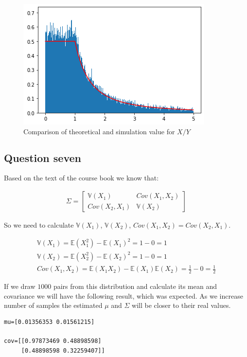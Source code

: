 \documentclass[12pt, a4paper]{book}
\begin{document}
\begin{figure}[h]
    \centering
    \includegraphics[width=0.5\linewidth]{images/question6/xy.png}
    \caption{Comparison of theoretical and simulation value for $X/Y$}
    \label{xy}
\end{figure}

\clearpage

\subsection*{Question seven}

Based on the text of the course book we know that:

\begin{eqnarray*}
    \Sigma = \begin{bmatrix}
        \mathbb{V}(X_1) & Cov(X_1, X_2) \\
        Cov(X_2, X_1) & \mathbb{V}(X_2)
    \end{bmatrix}
\end{eqnarray*}

So we need to calculate $\mathbb{V}(X_1)$, $\mathbb{V}(X_2)$, $Cov(X_1, X_2)=Cov(X_2, X_1)$.

\begin{eqnarray*}
    \mathbb{V}(X_1) = \mathbb{E}(X_1^2) - \mathbb{E}(X_1)^2 = 1 - 0 = 1 \\
    \mathbb{V}(X_2) = \mathbb{E}(X_2^2) - \mathbb{E}(X_2)^2 = 1 - 0 = 1 \\
    Cov(X_1, X_2) = \mathbb{E}(X_1X_2) - \mathbb{E}(X_1)\mathbb{E}(X_2) = \frac{1}{2} - 0 = \frac{1}{2}
\end{eqnarray*}

If we draw $1000$ pairs from this distribution and calculate its mean and covariance we will have
the following result, which was expected. As we increase number of samples the estimated $\mu$ and
$\Sigma$ will be closer to their real values.

\begin{mdframed}
\begin{verbatim}
mu=[0.01356353 0.01561215]

cov=[[0.97873469 0.48898598]
     [0.48898598 0.32259407]]
\end{verbatim}
\end{mdframed}
\end{document}
